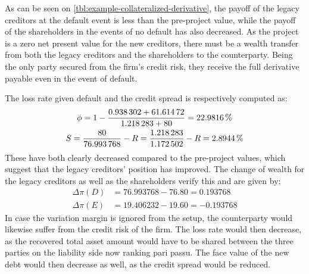 \documentclass[../main.tex]{subfiles}
\begin{document}
        As can be seen on \cref{tbl:example-collateralized-derivative}, the payoff of the legacy creditors at the default event is less than the pre-project value, while the payoff of the shareholders in the events of no default has also decreased. As the project is a zero net present value for the new creditors, there must be a wealth transfer from both the legacy creditors and the shareholders to the counterparty. Being the only party secured from the firm's credit risk, they receive the full derivative payable even in the event of default.

        The loss rate given default and the credit spread is respectively computed as:
            \begin{gather}
                \phi 
                = 
                    1 
                    - 
                    \frac{
                        \num{0.938302}+\num{61.61472}
                    }{
                        \num{1.218283}+\num{80}
                    }
                = 
                    \pct{0.229816}
                \\
                S 
                = 
                    \frac{
                        \num{80}    
                    }{
                        \num{76.993768} 
                    } 
                    - 
                    \grossrfrate 
                = 
                    \frac{
                        \num{1.218283}
                    }{        
                        \num{1.172502} 
                    } 
                    -
                    \grossrfrate 
                = 
                    \pct{0.028944} 
            \end{gather}
        These have both clearly decreased compared to the pre-project values, which suggest that the legacy creditors' position has improved.
        The change of wealth for the legacy creditors as well as the shareholders verify this and are given by:
        \begin{align}
            \Delta \pi(D) &= \num{76.993768} - \num{76.80} = \num{0.193768}\\
            \Delta \pi(E) &= \num{19.406232} - \num{19.60} = \num{-0.193768}
        \end{align}
        In case the variation margin is ignored from the setup, the counterparty would likewise suffer from the credit risk of the firm.
        The loss rate would then decrease,
        as the recovered total asset amount would have to be shared between the three parties on the liability side now ranking pari passu.
        The face value of the new debt would then decrease as well, as the credit spread would be reduced.
\end{document}

